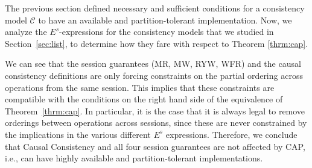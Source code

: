 \documentclass[journal,compsoc]{IEEEtran}
\begin{document}
The previous section defined necessary and sufficient conditions for 
a consistency model $\mathcal{C}$ to have an available and partition-tolerant
implementation. Now, we analyze the $E^s$-expressions for the consistency models that we studied in Section~\ref{sec:list}, to determine how they fare with respect to Theorem \ref{thrm:cap}.

We can see that the session guarantees (MR, MW, RYW, WFR) and the causal consistency definitions are only forcing constraints on the partial ordering across operations from the same session. This implies that these constraints are compatible with the conditions on the right hand side of the equivalence of Theorem~\ref{thrm:cap}. In particular, it is the case that it is always legal to remove orderings between operations across sessions, since these are never constrained by the implications in the various different $E^s$ expressions. Therefore, we conclude that Causal Consistency and all four session guarantees are not affected by CAP, i.e., can have highly available and partition-tolerant implementations.
\end{document}
